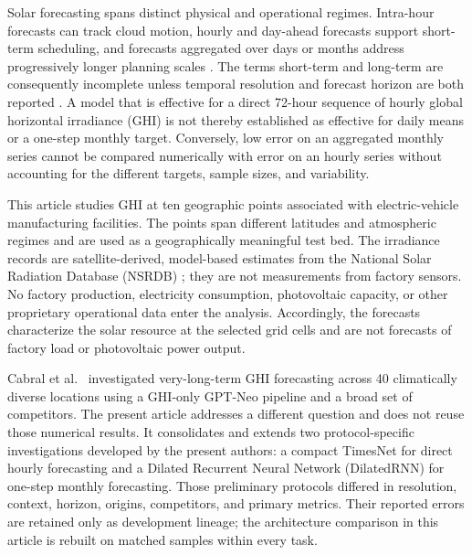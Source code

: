 Solar forecasting spans distinct physical and operational regimes. Intra-hour
forecasts can track cloud motion, hourly and day-ahead forecasts support
short-term scheduling, and forecasts aggregated over days or months address
progressively longer planning scales \cite{diagne2013,inman2013}. The terms
short-term and long-term are consequently incomplete unless temporal
resolution and forecast horizon are both reported
\cite{antonanzas2016,yang2018}. A model that is effective for a direct
72-hour sequence of hourly global horizontal irradiance (GHI) is not thereby
established as effective for daily means or a one-step monthly target.
Conversely, low error on an
aggregated monthly series cannot be compared numerically with error on an
hourly series without accounting for the different targets, sample sizes, and
variability.

This article studies GHI at ten geographic points associated with
electric-vehicle manufacturing facilities. The points span different
latitudes and atmospheric regimes and are used as a geographically meaningful
test bed. The irradiance records are satellite-derived, model-based estimates
from the National Solar Radiation Database (NSRDB) \cite{sengupta2018}; they
are not measurements from factory sensors.
No factory production, electricity consumption, photovoltaic capacity, or
other proprietary operational data enter the analysis. Accordingly, the
forecasts characterize the solar resource at the selected grid cells and are
not forecasts of factory load or photovoltaic power output.

Cabral et al.\ \cite{cabral2026} investigated very-long-term GHI forecasting
across 40 climatically diverse locations using a GHI-only GPT-Neo pipeline and
a broad set of competitors. The present article addresses a different
question and does not reuse those numerical results. It consolidates and
extends two protocol-specific investigations developed by the present authors:
a compact TimesNet for direct hourly forecasting and a Dilated Recurrent
Neural Network (DilatedRNN) for one-step monthly forecasting. Those preliminary
protocols differed in resolution, context, horizon, origins, competitors, and
primary metrics. Their reported errors are retained only as development
lineage; the architecture comparison in this article is rebuilt on matched
samples within every task.

